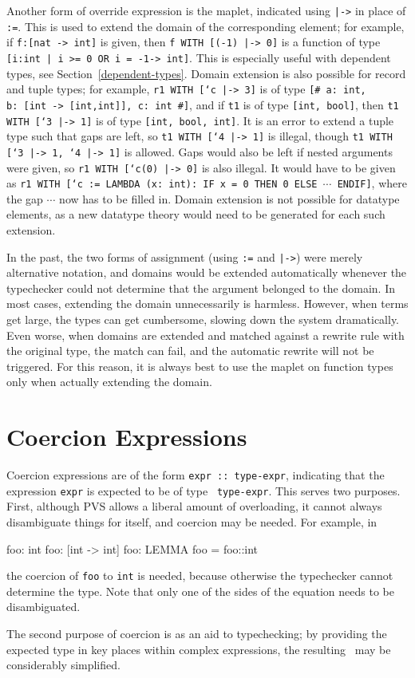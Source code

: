 Another form of override expression is the maplet, indicated using
\texttt{|->} in place of \texttt{:=}.  This is used to extend the domain
of the corresponding element; for example, if \texttt{f:[nat -> int]} is
given, then \texttt{f WITH [(-1) |-> 0]} is a function of type
\texttt{[\setb{}i:int | i >= 0 OR i = -1\sete -> int]}.  This is especially useful
with dependent types, see Section~\ref{dependent-types}.  Domain extension
is also possible for record and tuple types; for example, \texttt{r1 WITH
[`c |-> 3]} is of type \texttt{[\# a:\ int, b:\ [int -> [int,int]], c:\ int
\#]}, and if \texttt{t1} is of type \texttt{[int, bool]}, then \texttt{t1
WITH [`3 |-> 1]} is of type \texttt{[int, bool, int]}.  It is an error to
extend a tuple type such that gaps are left, so \texttt{t1 WITH [`4 |->
1]} is illegal, though \texttt{t1 WITH [`3 |-> 1, `4 |-> 1]} is allowed.
Gaps would also be left if nested arguments were given, so \texttt{r1 WITH
[`c(0) |-> 0]} is also illegal.  It would have to be given as \texttt{r1
WITH [`c := LAMBDA (x:\ int):\ IF x = 0 THEN 0 ELSE $\cdots$ ENDIF]}, where
the gap $\cdots$ now has to be filled in.  Domain extension is not
possible for datatype elements, as a new datatype theory would need to be
generated for each such extension.

In the past, the two forms of assignment (using \texttt{:=} and
\texttt{|->}) were merely alternative notation, and domains would be
extended automatically whenever the typechecker could not determine that
the argument belonged to the domain.  In most cases, extending the domain
unnecessarily is harmless.  However, when terms get large, the types can
get cumbersome, slowing down the system dramatically.  Even worse, when
domains are extended and matched against a rewrite rule with the original
type, the match can fail, and the automatic rewrite will not be triggered.
For this reason, it is always best to use the maplet on function types
only when actually extending the domain.

\section{Coercion Expressions}\label{coercions}

Coercion expressions are of the form \texttt{expr ::\ type-expr}, indicating
that the expression \texttt{expr} is expected to be of type \texttt{
type-expr}.  This serves two purposes.  First, although PVS allows a
liberal amount of overloading, it cannot always disambiguate things for
itself, and coercion may be needed.  For example, in
\begin{pvsex}
  foo: int
  foo: [int -> int]
  foo: LEMMA foo = foo::int
\end{pvsex}
%
the coercion of \texttt{foo} to \texttt{int} is needed, because otherwise the
typechecker cannot determine the type.  Note that only one of the sides
of the equation needs to be disambiguated.

The second purpose of coercion is as an aid to typechecking; by
providing the expected type in key places within complex expressions,
the resulting \tccs\ may be considerably simplified.




